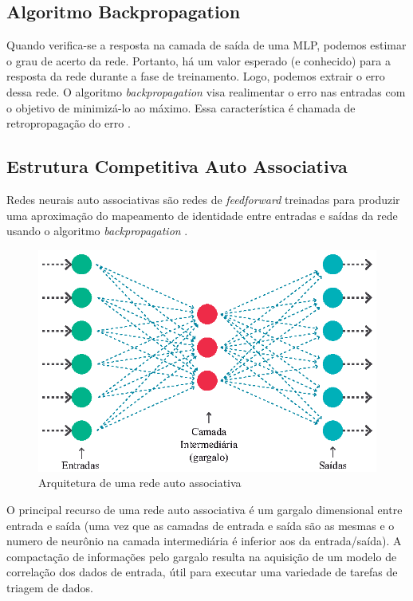 \subsection{Algoritmo Backpropagation}


Quando verifica-se a resposta na camada de saída de uma MLP, podemos estimar o grau de acerto da rede. Portanto, há um valor esperado (e conhecido) para a resposta da rede durante a fase de treinamento. Logo, podemos extrair o erro dessa rede. O algoritmo \textit{backpropagation} visa realimentar o erro nas entradas com o objetivo de minimizá-lo ao máximo. Essa característica é chamada de retropropagação do erro \cite{kovacs2002redes}.

\subsection{Estrutura Competitiva Auto Associativa}

Redes neurais auto associativas são redes de \textit{feedforward} treinadas para produzir uma aproximação do mapeamento de identidade entre entradas e saídas da rede usando o algoritmo \textit{backpropagation} \cite{Miranda}.

\begin{figure}[H]

\centering %
\includegraphics{04-Figuras/associativa}

\caption{Arquitetura de uma rede auto associativa}

\label{figura:associativa}

\end{figure}

O principal recurso de uma rede auto associativa é um gargalo dimensional entre entrada e saída (uma vez que as camadas de entrada e saída são as mesmas e o numero de neurônio na camada intermediária é inferior aos da entrada/saída). A compactação de informações pelo gargalo resulta na aquisição de um modelo de correlação dos dados de entrada, útil para executar uma variedade de tarefas de triagem de dados.


